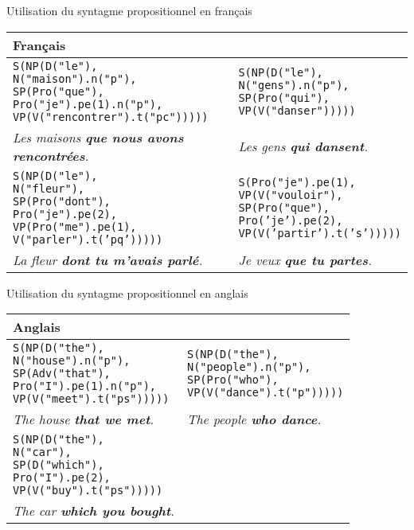 \documentclass[11pt]{article} %
\newcommand{\real}[1]{\emph{#1}}
\begin{document}
\begin{example}
\caption{Utilisation du syntagme propositionnel en français}
\begin{tabular}{p{8cm} | p{6.2cm}}
\hline 
\textbf{Français} \\
\hline
\begin{alltt}
S(NP(D("le"),
     N("maison").n("p"),
     SP(Pro("que"),
        Pro("je").pe(1).n("p"),
        VP(V("rencontrer").t("pc")))))
\end{alltt} &
\begin{alltt}
S(NP(D("le"),
     N("gens").n("p"),
     SP(Pro("qui"),
        VP(V("danser")))))
\end{alltt} \\
\real{Les maisons \textbf{que nous avons rencontrées}.} & \real{Les gens \textbf{qui dansent}.} \\
\hline
\begin{alltt}
S(NP(D("le"),
     N("fleur"),
     SP(Pro("dont"),
        Pro("je").pe(2),
        VP(Pro("me").pe(1),
           V("parler").t('pq')))))
\end{alltt} &
\begin{alltt}
S(Pro("je").pe(1),
  VP(V("vouloir"),
     SP(Pro("que"),
        Pro('je').pe(2),
        VP(V('partir').t('s')))))
\end{alltt} \\
\real{La fleur \textbf{dont tu m'avais parlé}.} & \real{Je veux \textbf{que tu partes}.} \\
\end{tabular}
\label{exPropFr}
\end{example}
\begin{example}
\caption{Utilisation du syntagme propositionnel en anglais}
\begin{tabular}{p{7cm} | p{7cm}}
\hline
\textbf{Anglais} \\
\hline
\begin{alltt}
S(NP(D("the"),
     N("house").n("p"),
     SP(Adv("that"),
        Pro("I").pe(1).n("p"),
        VP(V("meet").t("ps")))))
\end{alltt} &
\begin{alltt}
S(NP(D("the"),
     N("people").n("p"),
     SP(Pro("who"),
        VP(V("dance").t("p")))))
\end{alltt} \\
\real{The house \textbf{that we met}.} & \real{The people \textbf{who dance}.} \\
\hline
\begin{alltt}
S(NP(D("the"),
     N("car"),
     SP(D("which"),
        Pro("I").pe(2),
        VP(V("buy").t("ps")))))
\end{alltt} \\
\real{The car \textbf{which you bought}.}
\end{tabular}
\label{exPropEn}
\end{example}
\end{document}
